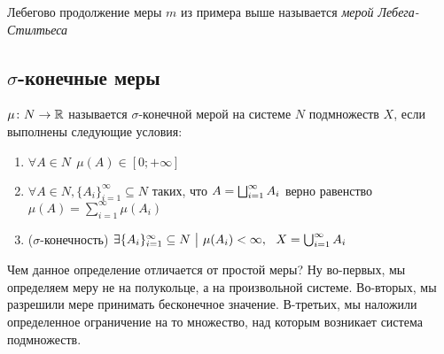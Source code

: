 \begin{definition}
	Лебегово продолжение меры $m$ из примера выше называется \textit{мерой Лебега-Стилтьеса}
\end{definition}

\subsection{$\sigma$-конечные меры}

\begin{definition}
	$\mu \colon N \to \mathbb{R}$ называется $\sigma$-конечной мерой на системе $N$ подмножеств $X$, если выполнены следующие условия:
	\begin{enumerate}
		\item $\forall A \in N\ \ \mu(A) \in [0; +\infty]$
		
		\item $\forall A \in N, \{A_i\}_{i = 1}^\infty \subseteq N$ таких, что $A = \bigsqcup_{i = 1}^\infty A_i$ верно равенство $\mu(A) = \sum_{i = 1}^\infty \mu(A_i)$
		
		\item ($\sigma$-конечность) $\exists \{A_i\}_{i = 1}^\infty \subseteq N \ \big|\  \mu(A_i) < \infty,\ \ X = \bigcup_{i = 1}^\infty A_i$
	\end{enumerate}
\end{definition}

\begin{note}
	Чем данное определение отличается от простой меры? Ну во-первых, мы определяем меру не на полукольце, а на произвольной системе. Во-вторых, мы разрешили мере принимать бесконечное значение. В-третьих, мы наложили определенное ограничение на то множество, над которым возникает система подмножеств.
\end{note}

